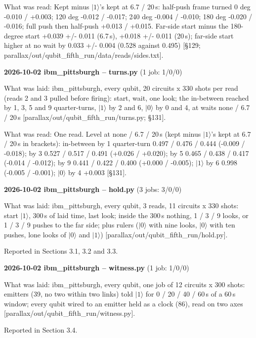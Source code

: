 \documentclass[11pt]{article}
\begin{document}
What was read: Kept minus \(|1\rangle\)'s kept at 6.7 / 20\,\textmu s: half-push frame turned 0 deg -0.010 / +0.003; 120 deg -0.012 / -0.017; 240 deg -0.004 / -0.010; 180 deg -0.020 / -0.016; full push then half-push +0.013 / +0.015. Far-side start minus the 180-degree start +0.039 +/- 0.011 (6.7\,\textmu s), +0.018 +/- 0.011 (20\,\textmu s); far-side start higher at no wait by 0.033 +/- 0.004 (0.528 against 0.495) {[}\S{}129; parallax/out/qubit\_fifth\_run/data/reads/sides.txt{]}.

\textbf{2026-10-02 ibm\_pittsburgh -- turns.py} (1 job: 1/0/0)

What was laid: ibm\_pittsburgh, every qubit, 20 circuits x 330 shots per read (reads 2 and 3 pulled before firing): start, wait, one look; the in-between reached by 1, 3, 5 and 9 quarter-turns, \(|1\rangle\) by 2 and 6, \(|0\rangle\) by 0 and 4, at waits none / 6.7 / 20\,\textmu s {[}parallax/out/qubit\_fifth\_run/turns.py; \S{}131{]}.

What was read: One read. Level at none / 6.7 / 20\,\textmu s (kept minus \(|1\rangle\)'s kept at 6.7 / 20\,\textmu s in brackets): in-between by 1 quarter-turn 0.497 / 0.476 / 0.444 (-0.009 / -0.018); by 3 0.527 / 0.517 / 0.491 (+0.026 / +0.020); by 5 0.465 / 0.438 / 0.417 (-0.014 / -0.012); by 9 0.441 / 0.422 / 0.400 (+0.000 / -0.005); \(|1\rangle\) by 6 0.998 (-0.005 / -0.001); \(|0\rangle\) by 4 +0.003 {[}\S{}131{]}.

\textbf{2026-10-02 ibm\_pittsburgh -- hold.py} (3 jobs: 3/0/0)

What was laid: ibm\_pittsburgh, every qubit, 3 reads, 11 circuits x 330 shots: start \(|1\rangle\), 300\,\textmu s of laid time, last look; inside the 300\,\textmu s nothing, 1 / 3 / 9 looks, or 1 / 3 / 9 pushes to the far side; plus rulers (\(|0\rangle\) with nine looks, \(|0\rangle\) with ten pushes, lone looks of \(|0\rangle\) and \(|1\rangle\)) {[}parallax/out/qubit\_fifth\_run/hold.py{]}.

Reported in Sections 3.1, 3.2 and 3.3.

\textbf{2026-10-02 ibm\_pittsburgh -- witness.py} (1 job: 1/0/0)

What was laid: ibm\_pittsburgh, every qubit, one job of 12 circuits x 300 shots: emitters (39, no two within two links) told \(|1\rangle\) for 0 / 20 / 40 / 60\,\textmu s of a 60\,\textmu s window; every qubit wired to an emitter held as a clock (86), read on two axes {[}parallax/out/qubit\_fifth\_run/witness.py{]}.

Reported in Section 3.4.
\end{document}
